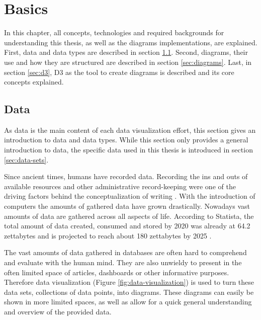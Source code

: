 \chapter{Basics}\label{sec:basics}

In this chapter, all concepts, technologies and required backgrounds for understanding this thesis, as well as the diagrams implementations, are explained. First, data and data types are described in section \ref{sec:data}. Second, diagrams, their use and how they are structured are described in section \ref{sec:diagrams}. Last, in section \ref{sec:d3}, D3 as the tool to create diagrams is described and its core concepts explained.


\section{Data}\label{sec:data}
As data is the main content of each data visualization effort, this section gives an introduction to data and data types. While this section only provides a general introduction to data, the specific data used in this thesis is introduced in section \ref{sec:data-sets}.

Since ancient times, humans have recorded data. Recording the ins and outs of available resources and other administrative record-keeping were one of the driving factors behind the conceptualization of writing \cite{senner1991origins}.
With the introduction of computers the amounts of gathered data have grown drastically. Nowadays vast amounts of data are gathered across all aspects of life. According to Statista, the total amount of data created, consumed and stored by 2020 was already at 64.2 zettabytes and is projected to reach about 180 zettabytes by 2025 \cite{statista_2022}.

The vast amounts of data gathered in databases are often hard to comprehend and evaluate with the human mind. They are also unwieldy to present in the often limited space of articles, dashboards or other informative purposes. Therefore data visualization (Figure \ref{fig:data-visualization}) is used to turn these data sets, collections of data points, into diagrams. These diagrams can easily be shown in more limited spaces, as well as allow for a quick general understanding and overview of the provided data.

